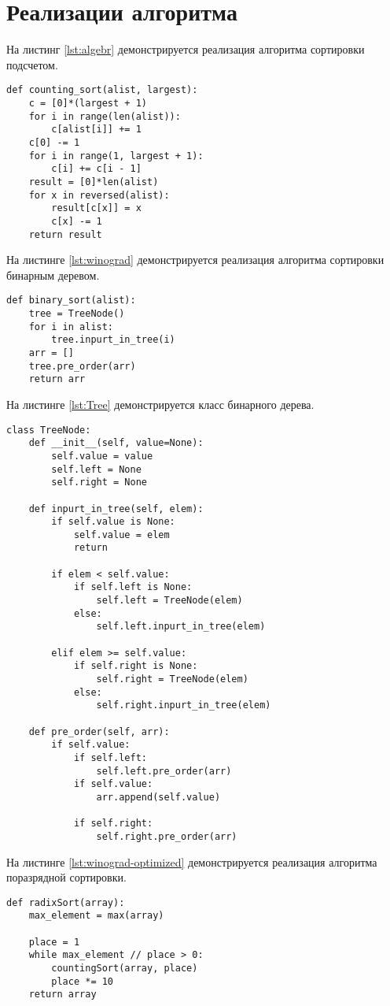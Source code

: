 \section{Реализации алгоритма}
На листинг \ref{lst:algebr} демонстрируется реализация алгоритма сортировки подсчетом. 


\captionsetup{singlelinecheck = false, justification=raggedright}
\begin{lstlisting}[label=lst:algebr,caption=Алгоритм сортировки подсчетомя]
def counting_sort(alist, largest):
	c = [0]*(largest + 1)
	for i in range(len(alist)):
		c[alist[i]] += 1
	c[0] -= 1
	for i in range(1, largest + 1):
		c[i] += c[i - 1]
	result = [0]*len(alist)
	for x in reversed(alist):
		result[c[x]] = x
		c[x] -= 1
	return result
\end{lstlisting}


На листинге \ref{lst:winograd} демонстрируется реализация алгоритма сортировки бинарным деревом.

\begin{lstlisting}[label=lst:winograd,caption=Алгоритм сортировки бинарным дерево]
def binary_sort(alist):
	tree = TreeNode()
	for i in alist:
		tree.inpurt_in_tree(i)
	arr = []
	tree.pre_order(arr)
	return arr
\end{lstlisting}	

На листинге \ref{lst:Tree} демонстрируется класс бинарного дерева.

\begin{lstlisting}[label=lst:Tree,caption=Класс бинарного дерев]
	class TreeNode:
	def __init__(self, value=None):
		self.value = value
		self.left = None
		self.right = None
	
	def inpurt_in_tree(self, elem):
		if self.value is None:
			self.value = elem
			return
		
		if elem < self.value:
			if self.left is None:
				self.left = TreeNode(elem)
			else:
				self.left.inpurt_in_tree(elem)
			
		elif elem >= self.value:
			if self.right is None:
				self.right = TreeNode(elem)
			else:
				self.right.inpurt_in_tree(elem)
	
	def pre_order(self, arr):
		if self.value:
			if self.left:
				self.left.pre_order(arr)
			if self.value: 
				arr.append(self.value)
			
			if self.right:
				self.right.pre_order(arr)
\end{lstlisting}	

\newpage
На листинге \ref{lst:winograd-optimized} демонстрируется реализация алгоритма поразрядной сортировки.
\begin{lstlisting}[label=lst:winograd-optimized,caption=Алгоритм поразрядной сортировки]
	def radixSort(array):
    max_element = max(array)

    place = 1
    while max_element // place > 0:
        countingSort(array, place)
        place *= 10
    return array
    
\end{lstlisting}	

